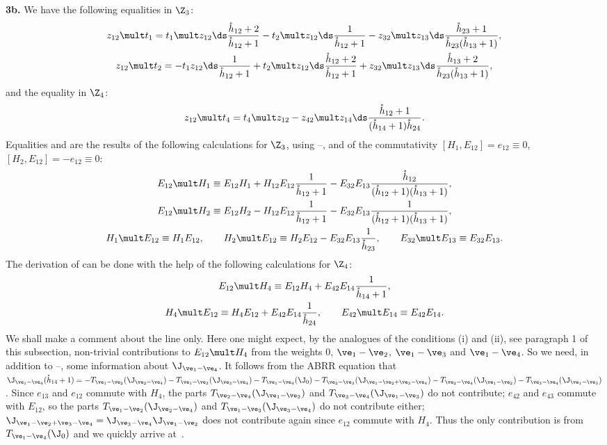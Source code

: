 \documentclass[11pt]{article}
\def\nplus{\mathfrak{n}}\def\nn{\nonumber}\def\nin{\noindent}
\def\s{z}\def\S{\mathrm {S}}\def\si{\sigma}\def\Sp{\S^{\nplus}}\def\sy{\acute{\sigma}}\def\th{\mathring{h}}
\numberwithin{equation}{section}
\begin{document}
{\bf 3b.} We have the following equalities in $\Z_3$:
\begin{gather}\label{proof15}
\s_{12}\mult t_1=t_1\mult\s_{12}  {\ds\frac{\th_{12}+2}{\th_{12}+1}}-t_2\mult\s_{12}  {\ds\frac{1}{\th_{12}+1}}
-\s_{32}\mult\s_{13}  {\ds\frac{\th_{23}+1}{\th_{23}(\th_{13}+1)}}  ,\\
\label{proof16}
\s_{12}\mult t_2=-t_1\s_{12}  {\ds\frac{1}{\th_{12}+1}}+t_2\mult\s_{12}
 {\ds\frac{\th_{12}+2}{\th_{12}+1}}+\s_{32}\mult\s_{13}  {\ds\frac{\th_{13}+2}{\th_{23}(\th_{13}+1)}}  ,
\end{gather}
and the equality in $\Z_4$:
\begin{gather}\label{proof17}
\s_{12}\mult t_4=t_4\mult\s_{12}-\s_{42}\mult\s_{14}  {\ds\frac{\th_{12}+1}{(\th_{14}+1)\th_{24}}}  .
\end{gather}
Equalities  and  are the results of the following calculations for $\Z_3$,
using --, and of the commutativity $[H_1,E_{12}]=e_{12}\equiv 0$,
$[H_2,E_{12}]=-e_{12}\equiv 0$:
\begin{gather*}E_{12}\mult H_1 \equiv E_{12}H_1+H_{12}E_{12}  \frac{1}{\th_{12}+1}-
E_{32}E_{13}  \frac{\th_{12}}{(\th_{12}+1)(\th_{13}+1)}  , \\
 E_{12}\mult H_2 \equiv E_{12}H_2-H_{12}E_{12}  \frac{1}{\th_{12}+1}-
E_{32}E_{13}  \frac{1}{(\th_{12}+1)(\th_{13}+1)}, \\
 H_1\mult E_{12} \equiv H_1E_{12}  , \qquad
 H_2\mult E_{12} \equiv H_2E_{12}-E_{32}E_{13}  \frac{1}{\th_{23}} , \qquad
 E_{32}\mult E_{13} \equiv E_{32}E_{13}  .\end{gather*}
The derivation of  can be done with the help of the following calculations for $\Z_4$:
\begin{gather}\label{pr14n}
E_{12}\mult H_4 \equiv E_{12}H_4+E_{42}E_{14}  \frac{1}{\th_{14}+1},\\
 H_4\mult E_{12} \equiv H_4E_{12}+E_{42}E_{14}  \frac{1}{\th_{24}}  ,\qquad
 E_{42}\mult E_{14} \equiv E_{42}E_{14}  .\nonumber
 \end{gather}
We shall make a comment about the line  only. Here one might expect, by  the analogues of the conditions (i) and (ii), see paragraph 1 of this subsection,
non-trivial contributions to $E_{12}\mult H_4$ from the weights 0, $\ve_1-\ve_2$, $\ve_1-\ve_3$ and $\ve_1-\ve_4$.
So we need, in addition to --, some information about
$\J_{\ve_1-\ve_4}$. It follows from the ABRR equation that $\J_{\ve_1-\ve_4}(\th_{14}+1)=-T_{\ve_1-\ve_2}(\J_{\ve_2-\ve_4})
-T_{\ve_1-\ve_3}(\J_{\ve_3-\ve_4})-T_{\ve_1-\ve_4}(\J_0)-T_{\ve_2-\ve_3}(\J_{\ve_1-\ve_2+\ve_3-\ve_4})-
T_{\ve_2-\ve_4}(\J_{\ve_1-\ve_2})-T_{\ve_3-\ve_4}(\J_{\ve_1-\ve_3})$. Since $e_{13}$ and $e_{12}$
commute with $H_4$, the parts $T_{\ve_2-\ve_4}(\J_{\ve_1-\ve_2})$ and $T_{\ve_3-\ve_4}(\J_{\ve_1-\ve_3})$
do not contribute; $e_{42}$ and $e_{43}$ commute with $E_{12}$, so the parts  $T_{\ve_1-\ve_2}(\J_{\ve_2-\ve_4})$
and $T_{\ve_1-\ve_3}(\J_{\ve_3-\ve_4})$ do not contribute either; $\J_{\ve_1-\ve_2+\ve_3-\ve_4}=
\J_{\ve_3-\ve_4}\J_{\ve_1-\ve_2}$ does not contribute again since $e_{12}$ commute with $H_4$.
Thus the only contribution is from $T_{\ve_1-\ve_4}(\J_0)$ and we quickly arrive at~.
\end{document}
